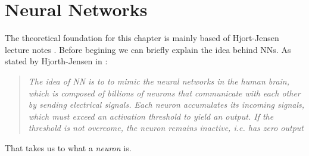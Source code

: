\documentclass[12pt, a4paper]{book}
\begin{document}
\newpage
\section{Neural Networks}\label{sec:theory_nn}
The theoretical foundation for this chapter is mainly based of Hjort-Jensen lecture notes \cite{MORTYY1, MORTYY2, MORTYY3}. Before begining we can briefly explain the idea behind NNs. As stated by Hjorth-Jensen in \cite{MORTYY1}:
\begin{quote}
    \textit{The idea of NN is to to mimic the neural networks in the human brain, which is composed of billions of neurons that communicate with each other by sending electrical signals. 
    Each neuron accumulates its incoming signals, which must exceed an activation threshold to yield an output. If the threshold is not overcome, the neuron remains inactive, i.e. has zero output}
\end{quote}
That takes us to what a \textit{neuron} is.
\end{document}
